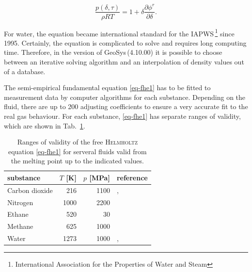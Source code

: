 \begin{equation}
\frac{p(\delta,\tau)}{\rho RT}=1+\delta \frac{\partial \phi^r}{\partial \delta}.
\label{eq-fhe-dens}
\end{equation}

For water, the equation became international standard for the IAPWS\,\footnote{International Association for the Properties of Water and Steam} since 1995. Certainly, the equation is complicated to solve and requires long computing time. Therefore, in the version of GeoSys\,(4.10.00) it is possible to choose between an iterative solving algorithm 
and an interpolation of density values out of a database. 

The semi-empirical fundamental equation \eqref{eq-fhe1} has to be fitted to measurement data by computer algorithms for each substance. Depending on the fluid, there are up to 200 adjusting coefficients to ensure a very accurate fit to the real gas behaviour. For each 
substance, \eqref{eq-fhe1} has separate ranges of validity, which are shown in Tab.~\ref{tab-eos-val}.

\begin{table}[H]
  \caption{\label{tab-eos-val}Ranges of validity of the free \textsc{Helmholtz} equation \eqref{eq-fhe1} for serveral fluids valid from the melting point up to the indicated 
  values.}
 \begin{center}
 \begin{tabular}{lrrl}
  \toprule
  	substance		&$T$ [K]    &$p$ [MPa]	&reference\\
  \midrule
  Carbon dioxide 	& 216 		& 1100 		& \cite{SpaWag:96}, \cite{Spa:93}\\
  Nitrogen      	 & 1000 		& 2200 		& \cite{SpaLem:00}\\
  Ethane        	 & 520 		& 30 			& \cite{BueWag:06}\\ 
  Methane       	 & 625 		& 1000 		& \cite{SetWag:91}\\
  Water         	 & 1273 		& 1000 		& \cite{PruWag:95}, \cite{WagPru:02}\\
 \bottomrule
 \end{tabular}
 \end{center}
\end{table}

%

